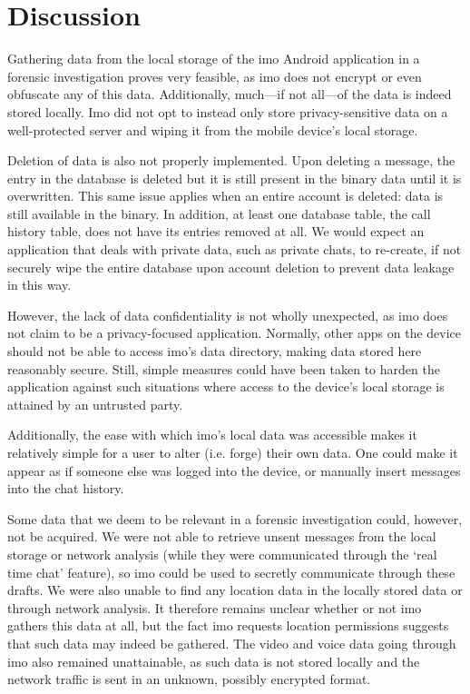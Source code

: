 \documentclass[conference]{IEEEtran}
\begin{document}
\section{Discussion}\label{sec:disc}

Gathering data from the local storage of the imo Android application in a
forensic investigation proves very feasible, as imo does not encrypt or even
obfuscate any of this data. Additionally, much---if not all---of the data is
indeed stored locally. Imo did not opt to instead only store privacy-sensitive
data on a well-protected server and wiping it from the mobile device's local
storage.

Deletion of data is also not properly implemented. Upon deleting a message,
the entry in the database is deleted but it is still present in the binary data
until it is overwritten. This same issue applies when an entire account is
deleted: data is still available in the binary. In addition, at least one
database table, the call history table, does not have its entries removed at
all. We would expect an application that deals with private data, such as
private chats, to re-create, if not securely wipe the entire database upon
account deletion to prevent data leakage in this way.

However, the lack of data confidentiality is not wholly unexpected, as imo does
not claim to be a privacy-focused application. Normally, other apps on the
device should not be able to access imo's data directory, making data stored
here reasonably secure. Still, simple measures could have been taken to harden
the application against such situations where access to the device's local
storage is attained by an untrusted party.

Additionally, the ease with which imo's local data was accessible makes it
relatively simple for a user to alter (i.e. forge) their own data. One could
make it appear as if someone else was logged into the device, or manually insert
messages into the chat history.

Some data that we deem to be relevant in a forensic investigation could,
however, not be acquired. We were not able to retrieve unsent messages from the
local storage or network analysis (while they were communicated through the
`real time chat' feature), so imo could be used to secretly communicate through
these drafts. We were also unable to find any location data in the locally
stored data or through network analysis. It therefore remains unclear whether
or not imo gathers this data at all, but the fact imo requests location
permissions suggests that such data may indeed be gathered. The video and voice
data going through imo also remained unattainable, as such data is not stored
locally and the network traffic is sent in an unknown, possibly encrypted
format.
\end{document}
